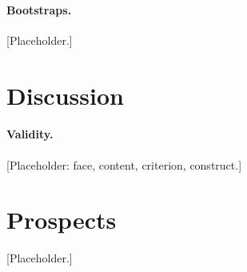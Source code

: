 \documentclass[10pt]{article}
\begin{document}
\paragraph{Bootstraps.} [Placeholder.]

\section{Discussion}
\label{sec:discussion}

\paragraph{Validity.} [Placeholder: face, content, criterion, construct.]

\section{Prospects}

[Placeholder.]



\end{document}
